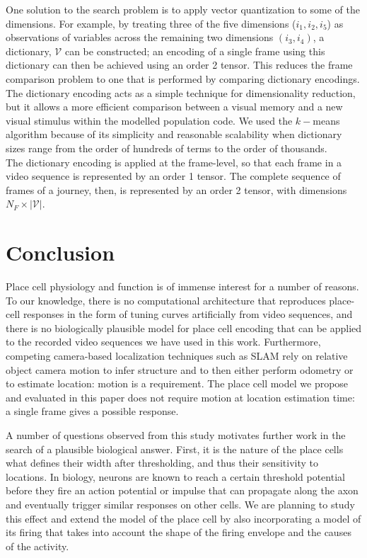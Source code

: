 One solution to the search problem is to apply vector quantization to some of the dimensions.  For example, by treating three of the five dimensions ($i_1,i_2,i_5$) as observations of variables across the remaining two dimensions $(i_3,i_4)$, a dictionary, $\mathcal{V}$ can be constructed; an encoding of a single frame using this dictionary can then be achieved using an order 2 tensor.  This reduces the frame comparison problem to one that is performed by comparing dictionary encodings. The dictionary encoding acts as a simple technique for dimensionality reduction, but it allows a more efficient comparison between a visual memory and a new visual stimulus within the modelled population code. We used the $k-$means algorithm because of its simplicity and reasonable scalability when dictionary sizes range from the order of hundreds of terms to the order of thousands.\\

The dictionary encoding is applied at the frame-level, so that each frame in a video sequence is represented by an order 1 tensor.  The complete sequence of frames of a journey, then, is represented by an order 2 tensor, with dimensions $N_F\times|\mathcal{V}|.$ 

\section{Conclusion}

Place cell physiology and function is of immense interest for a number of reasons. To our knowledge, there is no computational architecture that reproduces place-cell responses in the form of tuning curves artificially from video sequences, and there is no biologically plausible model for place cell encoding that can be applied to the recorded video sequences we have used in this work.  Furthermore, competing camera-based localization techniques such as SLAM rely on relative object camera motion to infer structure and to then either perform odometry or to estimate location: motion is a requirement.  The place cell model we propose and evaluated in this paper does not require motion at location estimation time: a single frame gives a possible response.

A number of questions observed from this study motivates further work in the search of a plausible biological answer. First, it is the nature of the place cells what defines their width after thresholding, and thus their sensitivity to locations. In biology, neurons are known to reach a certain threshold potential before they fire an action potential or impulse that can propagate along the axon and eventually trigger similar responses on other cells. We are planning to study this effect and extend the model of the place cell by also incorporating a model of its firing that takes into account the shape of the firing envelope and the causes of the activity.


